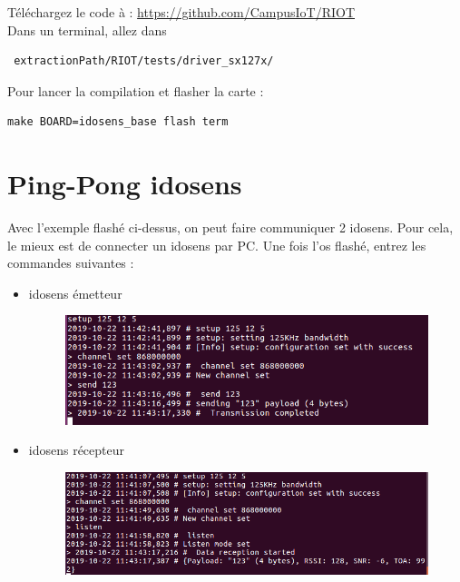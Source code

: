 \documentclass{article}
\begin{document}
Téléchargez le code à : \url{https://github.com/CampusIoT/RIOT}\\
Dans un terminal, allez dans 

\begin{verbatim}
 extractionPath/RIOT/tests/driver_sx127x/
\end{verbatim}



Pour lancer la compilation et flasher la carte :
\begin{verbatim}
make BOARD=idosens_base flash term
\end{verbatim}

\section{Ping-Pong idosens}

Avec l'exemple flashé ci-dessus, on peut faire communiquer 2 idosens. Pour cela, le mieux est de connecter un idosens par PC. Une fois l'os flashé, entrez les commandes suivantes :

\begin{itemize}
    \item idosens émetteur
    \begin{figure}[H]
    \begin{center}
    \advance\leftskip-3cm
    \advance\rightskip-3cm
    \includegraphics[keepaspectratio=true,scale=0.5]{ping_pong_idosens_sending.png}
    \label{visina8}
    \end{center}\end{figure}
    
    \item idosens récepteur
    \begin{figure}[H]
    \begin{center}
    \advance\leftskip-3cm
    \advance\rightskip-3cm
    \includegraphics[keepaspectratio=true,scale=0.5]{ping_pong_idosens_receiving.png}
    \label{visina8}
    \end{center}\end{figure}
    
\end{itemize}
\end{document}
